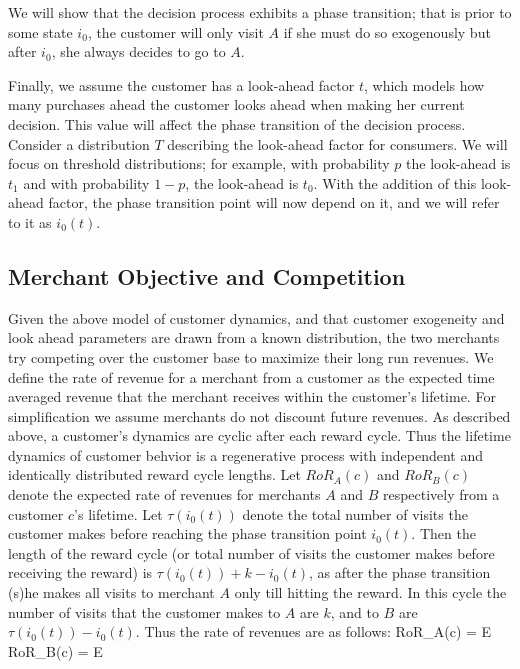 We will show that the decision process exhibits a phase transition; that is prior to some state $i_0$, the customer will only visit $A$ if she must do so exogenously but after $i_0$, she always decides to go to $A$. 

Finally, we assume the customer has a look-ahead factor $t$, which models how many purchases ahead the customer looks ahead when making her current decision. 
This value will affect the phase transition of the decision process. 
Consider a distribution $T$ describing the look-ahead factor for consumers. 
We will focus on threshold distributions; for example, with probability $p$ the look-ahead is $t_1$ and with probability $1-p$, the look-ahead is $t_0$.
With the addition of this look-ahead factor, the phase transition point will now depend on it, and we will refer to it as $i_0(t)$.

\subsection{Merchant Objective and Competition}
Given the above model of customer dynamics, and that customer exogeneity and look ahead parameters are drawn from a known distribution, the two merchants try competing over the customer base to maximize their long run revenues.
We define the rate of revenue for a merchant from a customer as the expected time averaged revenue that the merchant receives within the customer's lifetime.
For simplification we assume merchants do not discount future revenues.
As described above, a customer's dynamics are cyclic after each reward cycle.
Thus the lifetime dynamics of customer behvior is a regenerative process with independent and identically distributed reward cycle lengths.
Let $RoR_A(c)$ and $RoR_B(c)$ denote the expected rate of revenues for merchants $A$ and $B$ respectively from a customer $c$'s lifetime.
Let $\tau(i_0(t))$ denote the total number of visits the customer makes before reaching the phase transition point $i_0(t)$.
Then the length of the reward cycle (or total number of visits the customer makes before receiving the reward) is $\tau(i_0(t)) + k - i_0(t)$, as after the phase transition (s)he makes all visits to merchant $A$ only till hitting the reward.
In this cycle the number of visits that the customer makes to $A$ are $k$, and to $B$ are $\tau(i_0(t)) - i_0(t)$.
Thus the rate of revenues are as follows:
\beq
RoR_A(c) = \underset{\tau}E
\eeq
\beq
RoR_B(c) = \underset{\tau}E
\eeq

